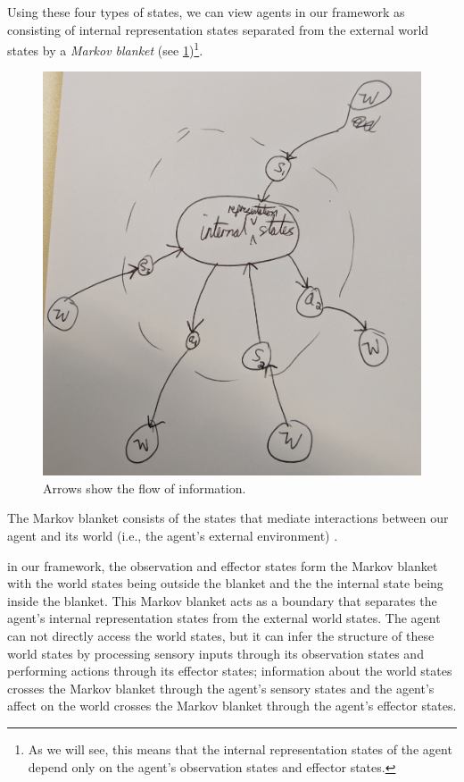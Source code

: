 Using these four types of states, we can view agents in our framework as consisting of internal representation states separated from the external world states by a \emph{Markov blanket} (see \cref{fig:markov_blanket})\footnote{
As we will see, this means that the internal representation states of the agent depend only on the agent's observation states and effector states.
}.

\begin{figure}[H]
	\centering
	\includegraphics[width=0.5\linewidth]{2MathematicalFramework/Images/markov_blanket.jpg}
	\caption{
		Arrows show the flow of information.
	}
	\label{fig:markov_blanket}
\end{figure}

The Markov blanket consists of the states that mediate interactions between our agent and its world (i.e., the agent's external environment) \cite{Ramstead2020}.

 in our framework, the observation and effector states form the Markov blanket with the world states being outside the blanket and the the internal state being inside the blanket.
This Markov blanket acts as a boundary that separates the agent's internal representation states from the external world states.
The agent can not directly access the world states, but it can infer the structure of these world states by processing sensory inputs through its observation states and performing actions through its effector states; information about the world states crosses the Markov blanket through the agent's sensory states and the agent's affect on the world crosses the Markov blanket through the agent's effector states.

